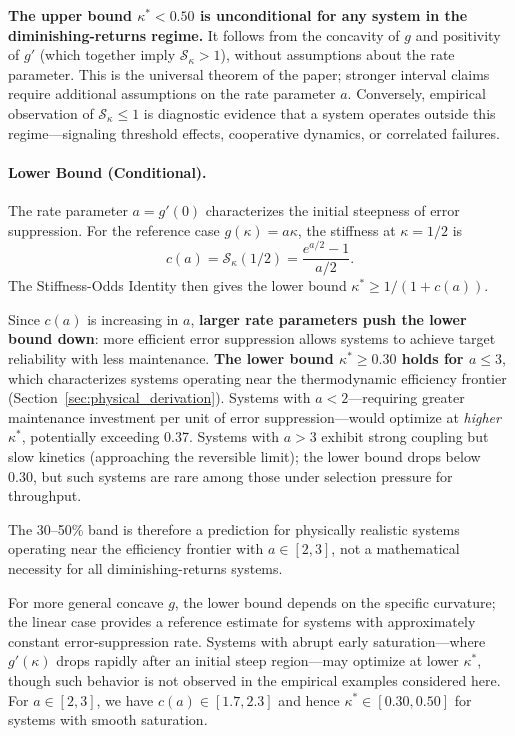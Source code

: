 \documentclass[11pt,twocolumn]{article}
\begin{document}
\textbf{The upper bound $\kappa^* < 0.50$ is unconditional for any system in the diminishing-returns regime.} It follows from the concavity of $g$ and positivity of $g'$ (which together imply $\mathcal{S}_\kappa > 1$), without assumptions about the rate parameter. This is the universal theorem of the paper; stronger interval claims require additional assumptions on the rate parameter $a$. Conversely, empirical observation of $\mathcal{S}_\kappa \leq 1$ is diagnostic evidence that a system operates outside this regime---signaling threshold effects, cooperative dynamics, or correlated failures.

\paragraph{Lower Bound (Conditional).} The rate parameter $a = g'(0)$ characterizes the initial steepness of error suppression. For the reference case $g(\kappa) = a\kappa$, the stiffness at $\kappa = 1/2$ is
\begin{equation}
c(a) = \mathcal{S}_\kappa(1/2) = \frac{e^{a/2} - 1}{a/2}.
\label{eq:c_of_a}
\end{equation}
The Stiffness-Odds Identity then gives the lower bound $\kappa^* \ge 1/(1 + c(a))$.

Since $c(a)$ is increasing in $a$, \textbf{larger rate parameters push the lower bound down}: more efficient error suppression allows systems to achieve target reliability with less maintenance. \textbf{The lower bound $\kappa^* \geq 0.30$ holds for $a \leq 3$}, which characterizes systems operating near the thermodynamic efficiency frontier (Section~\ref{sec:physical_derivation}). Systems with $a < 2$---requiring greater maintenance investment per unit of error suppression---would optimize at \emph{higher} $\kappa^*$, potentially exceeding 0.37. Systems with $a > 3$ exhibit strong coupling but slow kinetics (approaching the reversible limit); the lower bound drops below 0.30, but such systems are rare among those under selection pressure for throughput.

The 30--50\% band is therefore a prediction for physically realistic systems operating near the efficiency frontier with $a \in [2, 3]$, not a mathematical necessity for all diminishing-returns systems.

For more general concave $g$, the lower bound depends on the specific curvature; the linear case provides a reference estimate for systems with approximately constant error-suppression rate. Systems with abrupt early saturation---where $g'(\kappa)$ drops rapidly after an initial steep region---may optimize at lower $\kappa^*$, though such behavior is not observed in the empirical examples considered here. For $a \in [2,3]$, we have $c(a) \in [1.7, 2.3]$ and hence $\kappa^* \in [0.30, 0.50]$ for systems with smooth saturation.
\end{document}
